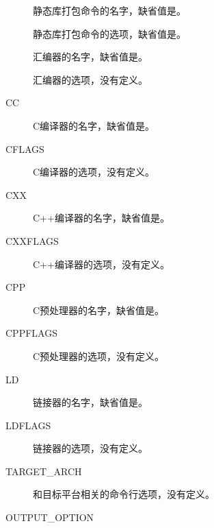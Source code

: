 \begin{description}
\item[{}]


静态库打包命令的名字，缺省值是。

\item[{}]


静态库打包命令的选项，缺省值是。

\item[{}]


汇编器的名字，缺省值是。

\item[{}]


汇编器的选项，没有定义。

\item[{CC}]


C编译器的名字，缺省值是。

\item[{CFLAGS}]


C编译器的选项，没有定义。

\item[{CXX}]


C+\BookSplit{}+\BookSplit{}编译器的名字，缺省值是。

\item[{CXXFLAGS}]


C+\BookSplit{}+\BookSplit{}编译器的选项，没有定义。

\item[{CPP}]


C预处理器的名字，缺省值是。

\item[{CPPFLAGS}]


C预处理器的选项，没有定义。

\item[{LD}]


链接器的名字，缺省值是。

\item[{LDFLAGS}]


链接器的选项，没有定义。

\item[{TARGET\_\BookSplit{}ARCH}]


和目标平台相关的命令行选项，没有定义。

\item[{OUTPUT\_\BookSplit{}OPTION}]



\end{description}
